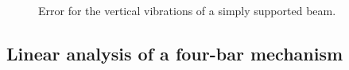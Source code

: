 \documentclass{svjour3}                     %
\begin{document}
{\begin{figure}[tbh]
	\hspace{8pt}%
	\hspace{8pt}%
	 \\
	\caption{Error for the vertical vibrations of a simply supported beam.}%
	\label{fig:errorHerDG1}%
\end{figure}
}


\subsection{Linear analysis of a four-bar mechanism}
\end{document}
